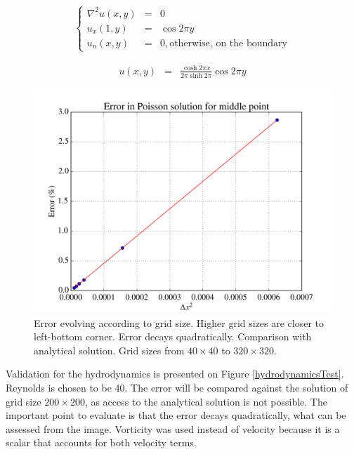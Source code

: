 \documentclass[journal]{IEEEtran}
\begin{document}
\begin{eqnarray}
\left\{\begin{array}{ccl}
\nabla^2u(x,y) & = & 0\\
u_x(1,y) & = & \cos 2\pi y\\
u_n(x,y) & = & 0, \textrm{otherwise, on the boundary}
\end{array}\right.\label{poissonTest1}
\end{eqnarray}

\begin{eqnarray}
u(x,y) & = & \frac{\cosh 2\pi x}{2\pi \sinh 2\pi}\cos 2 \pi y \label{solutionPoissonTest1}
\end{eqnarray}

\begin{figure}[!ht]
\centering
\includegraphics[width=\linewidth]{figures/validatePoissonP2}
\caption{Error evolving according to grid size. Higher grid sizes are closer to left-bottom corner. Error decays quadratically. Comparison with analytical solution. Grid sizes from $40\times 40$ to $320\times 320$. \label{errorPoissonTest}}
\end{figure}

Validation for the hydrodynamics is presented on Figure \ref{hydrodynamicsTest}. Reynolds is chosen to be 40. The error will be compared against the solution of grid size $200\times 200$, as access to the analytical solution is not possible. The important point to evaluate is that the error decays quadratically, what can be assessed from the image. Vorticity was used instead of velocity because it is a scalar that accounts for both velocity terms. 
\end{document}
